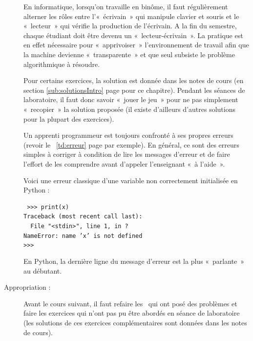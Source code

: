 \begin{description}
	En informatique, lorsqu'on travaille en binôme, il faut régulièrement 
	alterner les rôles entre l'«~écrivain~» qui manipule clavier et souris 
	et le «~lecteur~» qui vérifie la production de l'écrivain. A la fin
	du semestre, chaque étudiant doit être devenu un «~lecteur-écrivain~».
	La pratique est en effet nécessaire pour «~apprivoiser~» l'environnement 
	de travail afin que la machine devienne «~transparente~» et que seul 
	subsiste le problème algorithmique à résoudre.
	
	Pour certains exercices, la solution est donnée dans les notes de cours
	(en section \ref{sub:solutionsIntro} page \pageref{sub:solutionsIntro} pour ce chapitre).
	Pendant les séances de laboratoire, il faut donc savoir «~jouer le jeu~»
	pour ne pas simplement «~recopier~» la solution proposée (il existe
	d'ailleurs d'autres solutions pour la plupart des exercices).
	
	Un apprenti programmeur est toujours confronté à ses propres erreurs
	(revoir le \tdir\ \ref{td:erreur} page \pageref{td:erreur} par exemple). 
	En général, ce sont des erreurs simples à corriger à condition
	de lire les messages d'erreur et de faire l'effort 
	de les comprendre avant d'appeler l'enseignant «~à l'aide~».
	\begin{ex}
	Voici une erreur classique d'une variable non correctement initialisée en {\sc Python} :\\[1mm]
	\mbox{}\hspace*{1cm}\begin{minipage}{12cm}\tt
	>>> print(x)\\
        Traceback (most recent call last):\\
        \mbox{}\ \ File "<stdin>", line 1, in ?\\
        NameError: name 'x' is not defined\\
        >>> 
	\end{minipage}
	\end{ex}
	En {\sc Python}, la dernière ligne du message d'erreur est la plus 
	«~parlante~» au débutant.
\item[Appropriation :] 
	Avant le cours suivant, il faut refaire les \tdir\ qui
	ont posé des problèmes et faire les exercices qui n'ont pas pu
	être abordés en séance de laboratoire (les solutions de ces
	exercices complémentaires sont données dans les notes de cours).
\end{description}	


